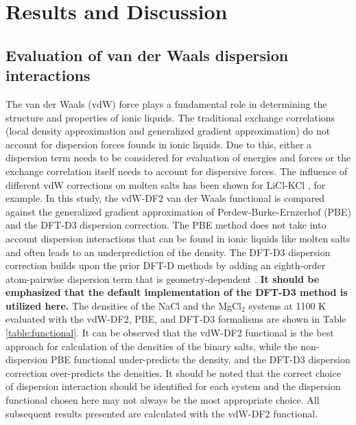 \documentclass[review]{elsarticle}
\providecommand{\DIFaddtex}[1]{{\bf #1}} %
\providecommand{\DIFaddbegin}{\protect\color{blue}} %
\providecommand{\DIFaddend}{\protect\color{black}} %
\providecommand{\DIFadd}[1]{\texorpdfstring{\DIFaddtex{#1}}{#1}} %
\newcommand{\DIFaddincludegraphics}[2][]{{\color{blue}\fbox{\DIFOincludegraphics[#1]{#2}}}} %
\DeclareRobustCommand{\DIFaddbegin}{\DIFOaddbegin \let\includegraphics\DIFaddincludegraphics} %
\DeclareRobustCommand{\DIFaddend}{\DIFOaddend \let\includegraphics\DIFOincludegraphics} %
\begin{document}
\section{Results and Discussion}

\subsection{Evaluation of van der Waals dispersion interactions}

The van der Waals (vdW) force plays a fundamental role in determining the structure and properties of ionic liquids. The traditional exchange correlations (local density approximation and generalized gradient approximation) do not account for dispersion forces founds in ionic liquids. Due to this, either a dispersion term needs to be considered for evaluation of energies and forces or the exchange correlation itself needs to account for dispersive forces. The influence of different vdW corrections on molten salts has been shown for LiCl-KCl \cite{Duemmler2021}, for example. In this study, the vdW-DF2 van der Waals functional \cite{Dion2004} is compared against the generalized gradient approximation of Perdew-Burke-Ernzerhof (PBE) \cite{PBE1996} and the DFT-D3 \cite{grimm2010} dispersion correction. The PBE method does not take into account dispersion interactions that can be found in ionic liquids like molten salts and often leads to an underprediction of the density. The DFT-D3 dispersion correction builds upon the prior DFT-D methods by adding an eighth-order atom-pairwise dispersion term that is geometry-dependent \cite{grimm2010}. \DIFaddbegin \DIFadd{It should be emphasized that the default implementation of the DFT-D3 method is utilized here. }\DIFaddend The densities of the NaCl and the MgCl$_2$ systems at 1100 K evaluated with the vdW-DF2, PBE, and DFT-D3 formalisms are shown in Table \ref{table:functional}. It can be observed that the vdW-DF2 functional is the best approach for calculation of the densities of the binary salts, while the non-dispersion PBE functional under-predicts the density, and the DFT-D3 dispersion correction over-predicts the densities. It should be noted that the correct choice of dispersion interaction should be identified for each system and the dispersion functional chosen here may not always be the most appropriate choice. All subsequent results presented are calculated with the vdW-DF2 functional.
\end{document}
